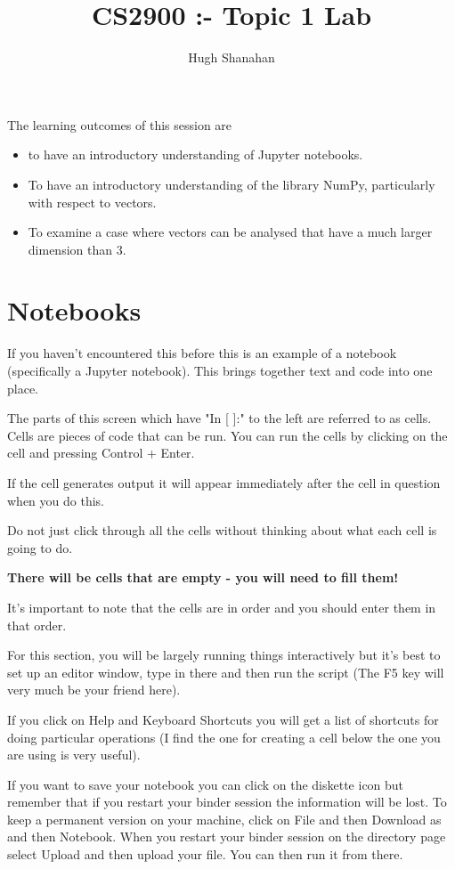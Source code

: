 \documentclass[11pt]{amsart}
\title{CS2900 :- Topic 1 Lab}
\author{Hugh Shanahan}
\begin{document}
\lstset{basicstyle=\ttfamily}
\lstset{showstringspaces=true}
\lstset{language=Python}


The learning outcomes of this session are

\begin{itemize}
\item to have an introductory understanding of Jupyter notebooks.
\item To have an introductory understanding of the library NumPy, particularly with respect to vectors.
\item To examine a case where vectors can be analysed that have a much larger dimension than 3. 
\end{itemize}


\section{Notebooks}

 If you haven't encountered this before this is an example of a notebook (specifically a Jupyter notebook). This brings together text and code into one place.

The parts of this screen which have "In [ ]:" to the left are referred to as cells. Cells are pieces of code that can be run. You can run the cells by clicking on the cell and pressing Control + Enter.

If the cell generates output it will appear immediately after the cell in question when you do this.

Do not just click through all the cells without thinking about what each cell is going to do. 

{\bf There will be cells that are empty - you will need to fill them!}

It's important to note that the cells are in order and you should enter them in that order.

For this section, you will be largely running things interactively but it’s best to set up an editor window, type in there and then run the script (The F5 key will very much be your friend here). 

If you click on Help  and Keyboard Shortcuts you will get a list of shortcuts for doing particular operations (I find the one for creating a cell below the one you are using is very useful). 

If you want to save your notebook you can click on the diskette icon but remember that if you restart your binder session the information 
will be lost. To keep a permanent version on your machine, click on File and then Download as and then Notebook. When you restart your 
binder session on the directory page select Upload and then upload your file. You can then run it from there. 
\end{document}
